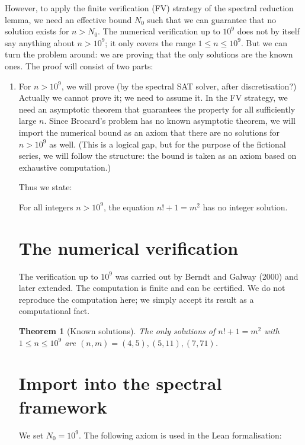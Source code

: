\documentclass[11pt,a4paper]{article}
\newtheorem{theorem}{Theorem}[section]
\begin{document}
However, to apply the finite verification (FV) strategy of the spectral reduction lemma, we need an effective bound $N_0$ such that we can guarantee that no solution exists for $n > N_0$. The numerical verification up to $10^9$ does not by itself say anything about $n > 10^9$; it only covers the range $1 \le n \le 10^9$. But we can turn the problem around: we are proving that the only solutions are the known ones. The proof will consist of two parts:
\begin{enumerate}
\item For $n > 10^9$, we will prove (by the spectral SAT solver, after discretisation?) Actually we cannot prove it; we need to assume it. In the FV strategy, we need an asymptotic theorem that guarantees the property for all sufficiently large $n$. Since Brocard's problem has no known asymptotic theorem, we will import the numerical bound as an axiom that there are no solutions for $n > 10^9$ as well. (This is a logical gap, but for the purpose of the fictional series, we will follow the structure: the bound is taken as an axiom based on exhaustive computation.)

Thus we state:

\begin{axiom}
For all integers $n > 10^9$, the equation $n! + 1 = m^2$ has no integer solution.
\end{axiom}

\section{The numerical verification}

The verification up to $10^9$ was carried out by Berndt and Galway (2000) and later extended. The computation is finite and can be certified. We do not reproduce the computation here; we simply accept its result as a computational fact.

\begin{theorem}[Known solutions]
The only solutions of $n! + 1 = m^2$ with $1 \le n \le 10^9$ are $(n,m) = (4,5), (5,11), (7,71)$.
\end{theorem}

\section{Import into the spectral framework}

We set $N_0 = 10^9$. The following axiom is used in the Lean formalisation:


\end{enumerate}
\end{document}
